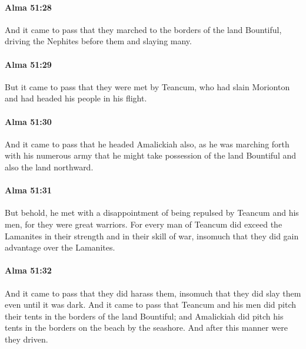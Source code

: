 		\paragraph{Alma 51:28} %
			\label{ALMA-51-28}

			And it came to pass that they marched to the borders of the land Bountiful,
			driving the Nephites before them and slaying many.

		\paragraph{Alma 51:29} %
			\label{ALMA-51-29}

			But it came to pass that they were met by Teancum,
			who had slain Morionton and had headed his people in his flight.

		\paragraph{Alma 51:30} %
			\label{ALMA-51-30}

			And it came to pass that he headed Amalickiah also,
			as he was marching forth with his numerous army
			that he might take possession of the land Bountiful and also the land northward.

		\paragraph{Alma 51:31} %
			\label{ALMA-51-31}

			But behold, he met with a disappointment
			of being repulsed by Teancum and his men,
			for they were great warriors.
			For every man of Teancum did exceed the Lamanites
			in their strength and in their skill of war,
			insomuch that they did gain advantage over the Lamanites.

		\paragraph{Alma 51:32} %
			\label{ALMA-51-32}

			And it came to pass that they did harass them,
			insomuch that they did slay them even until it was dark.
			And it came to pass that
			Teancum and his men did pitch their tents in the borders of the land Bountiful;
			and Amalickiah did pitch his tents in the borders on the beach by the seashore.
			And after this manner were they driven.

